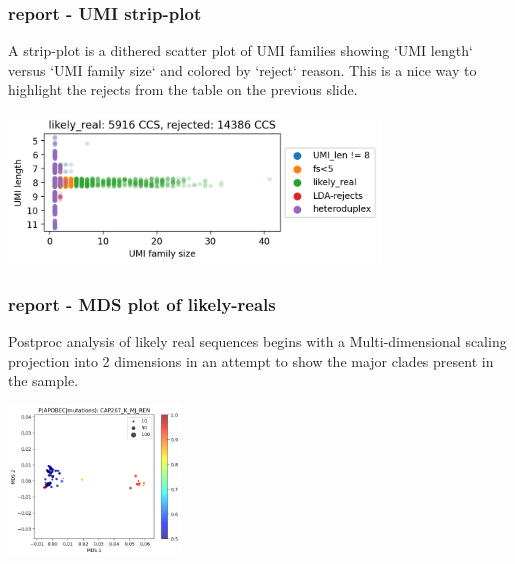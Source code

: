 \documentclass{beamer}
\begin{document}
\begin{frame}[fragile]
\frametitle{report - UMI strip-plot}

\alert<1> 

A strip-plot is a dithered scatter plot of UMI families
showing `UMI length` versus `UMI family size` and colored
by `reject` reason. This is a nice way to highlight the
rejects from the table on the previous slide.

\bigskip
\begin{center}
\includegraphics[height=4cm]{images/strip-plot.png} 
\end{center}

\end{frame}


\begin{frame}[fragile]
\frametitle{report - MDS plot of likely-reals}

\alert<1> 

Postproc analysis of likely real sequences begins with a
Multi-dimensional scaling projection into 2 dimensions 
in an attempt to show the major clades present in the
sample.

\bigskip
\begin{center}
\includegraphics[height=4cm]{images/mds.png} 
\end{center}

\end{frame}
\end{document}
